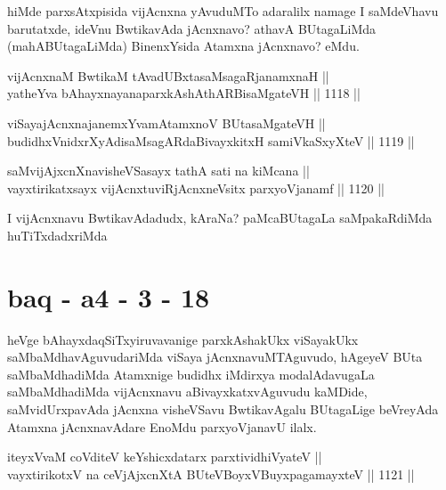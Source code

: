 \begin{artha}
hiMde parxsAtxpisida vijAcnxna yAvuduMTo adaralilx namage I saMdeVhavu barutatxde, ideVnu BwtikavAda jAcnxnavo? athavA BUtagaLiMda (mahABUtagaLiMda) BinenxYsida Atamxna jAcnxnavo? eMdu.
\end{artha}


\begin{shl}
vijAcnxnaM BwtikaM tAvadUBxtasaMsagaRjanamxnaH || \\
yatheYva bAhayxnayanaparxkAshAthARBisaMgateVH ||  1118 ||  
\end{shl}
				
\begin{shl}
viSayajAcnxnajanemxYvamAtamxnoV BUtasaMgateVH || \\
budidhxVnidxrXyAdisaMsagARdaBivayxkitxH samiVkaSxyXteV ||  1119 || 
\end{shl}
				
\begin{shl}
saMvijAjxcnXnavisheVSasayx tathA sati na kiMcana || \\
vayxtirikatxsayx vijAcnxtuviRjAcnxneV\s sitx parxyoVjanamf ||  1120 ||  
\end{shl}

\begin{artha}
I vijAcnxnavu BwtikavAdadudx, kAraNa? paMcaBUtagaLa saMpakaRdiMda huTiTxdadxriMda
\end{artha}

\section*{baq - a4 - 3 - 18}


\begin{artha}
heVge bAhayxdaqSiTxyiruvavanige parxkAshakUkx viSayakUkx saMbaMdhavAguvudariMda viSaya jAcnxnavuMTAguvudo, hAgeyeV BUta saMbaMdhadiMda Atamxnige budidhx iMdirxya modalAdavugaLa saMbaMdhadiMda vijAcnxnavu aBivayxkatxvAguvudu kaMDide, saMvidUrxpavAda jAcnxna visheVSavu BwtikavAgalu BUtagaLige beVreyAda Atamxna jAcnxnavAdare EnoMdu parxyoVjanavU ilalx.
\end{artha}


\begin{shl}
iteyxVvaM coVditeV keYshicxdatarx parxtividhiVyateV || \\
vayxtirikotxV na ceVjAjxcnXtA BUteVBoyxV\s BuyxpagamayxteV ||  1121 ||  
\end{shl}

